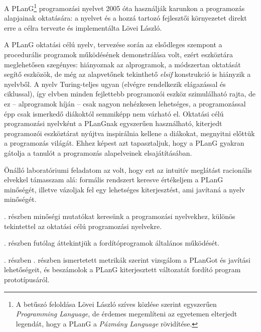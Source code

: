 

A PLanG\footnote{%
	A betűszó feloldása Lövei László szíves közlése szerint egyszerűen \textit{Programming Lan\-guage}, de érdemes megemlíteni az egyetemen elterjedt legendát, hogy a PLanG a \textit{Pázmány Language} rövidítése.}
programozási nyelvet 2005 óta használják karunkon a programozás alapjainak oktatására: a nyelvet és a hozzá tartozó fejlesztői környezetet direkt erre a célra tervezte és implementálta Lövei László.

A PLanG oktatási célú nyelv, tervezése során az elsődleges szempont a procedurális programok működésének demonstrálása volt\cite{lovei}, ezért eszköztára meglehetősen szegényes: hiányoznak az alprogramok, a módszertan oktatását segítő eszközök, de még az alapvetőnek tekinthető \textit{elsif} kon\-strukció is hiányzik a nyelvből.
A nyelv Turing-teljes ugyan (elvégre rendelkezik elágazással és ciklussal), így elvben minden fejlettebb programozói eszköz szimulálható rajta, de ez -- alprogramok híján -- csak nagyon nehézkesen lehetséges, a programozással épp csak ismerkedő diákoktól semmiképp nem várható el.
Oktatási célú programozási nyelvként a PLanGnak egyszerűen használható, kiterjedt programozói eszköztárat nyújtva inspirálnia kellene a diákokat, megnyitni előttük a programozás világát.
Ehhez képest azt tapasztaljuk, hogy a PLanG gyakran gátolja a tanulót a programozás alapelveinek elsajátításában.

Önálló laboratóriumi feladatom az volt, hogy ezt az intuitív meglátást racionális elvekkel támasszam alá: formális rendszert keresve értékeljem a PLanG minőségét, illetve vázoljak fel egy lehetséges kiterjesztést, ami javítaná a nyelv minőségét.

. részben minőségi mutatókat keresünk a programozási nyelvekhez, különös tekintettel az oktatási célú programozási nyelvekre.

. részben futólag áttekintjük a fordítóprogramok általános működését.

. részben . részben ismertetett metrikák szerint vizsgálom a PLanGot és javítási lehetőségeit, és beszámolok a PLanG kiterjesztett változatát fordító program prototípusáról.
